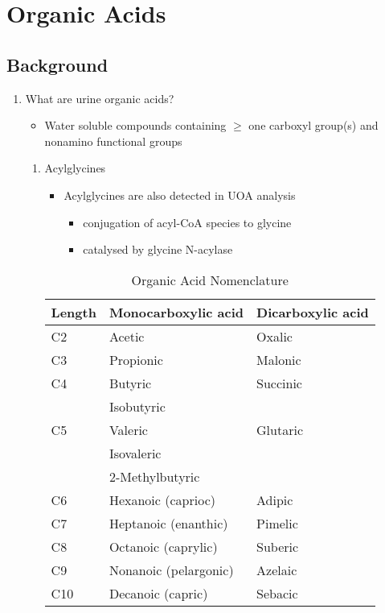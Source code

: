 \documentclass{scrartcl}
\begin{document}
\section{Organic Acids}
\label{sec:org6a26c69}
\subsection{Background}
\label{sec:org5074331}
\begin{enumerate}
\item What are urine organic acids?
\label{sec:org2702143}
\begin{itemize}
\item Water soluble compounds containing \(\ge\) one carboxyl group(s) and
nonamino functional groups
\end{itemize}

\centering
{}
\begin{enumerate}
\item Acylglycines
\label{sec:org0c71a6b}
\begin{itemize}
\item Acylglycines are also detected in UOA analysis
\begin{itemize}
\item conjugation of acyl-CoA species to glycine
\item catalysed by glycine N-acylase
\end{itemize}
\end{itemize}

\begin{table}[htbp]
\caption{\label{tab:org56ea60c}
Organic Acid Nomenclature}
\centering
\begin{tabular}{lll}
Length & Monocarboxylic acid & Dicarboxylic acid\\
\hline
C2 & Acetic & Oxalic\\
C3 & Propionic & Malonic\\
C4 & Butyric & Succinic\\
 & Isobutyric & \\
C5 & Valeric & Glutaric\\
 & Isovaleric & \\
 & 2-Methylbutyric & \\
C6 & Hexanoic (caprioc) & Adipic\\
C7 & Heptanoic (enanthic) & Pimelic\\
C8 & Octanoic (caprylic) & Suberic\\
C9 & Nonanoic (pelargonic) & Azelaic\\
C10 & Decanoic (capric) & Sebacic\\
\end{tabular}
\end{table}
\end{enumerate}



\end{enumerate}
\end{document}
